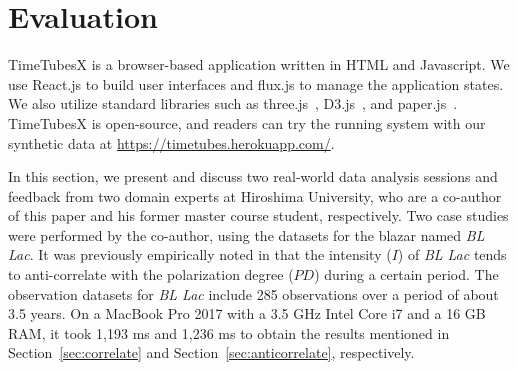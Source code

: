 \section{Evaluation\label{sec:evaluation}}
TimeTubesX is a browser-based application written in HTML and Javascript.
We use React.js to build user interfaces and flux.js to manage the application states.
We also utilize standard libraries such as three.js~\cite{three_framework}, D3.js~\cite{d3_framework}, and paper.js~\cite{paper_framework}.
TimeTubesX is open-source, and 
readers can try the running system with our synthetic data at \url{https://timetubes.herokuapp.com/}.

In this section, we present and discuss two real-world data analysis sessions and feedback from two domain experts at Hiroshima University, who are a co-author of this paper and his former master course student, respectively.
Two case studies were performed by the co-author, using the datasets for the blazar named \emph{BL Lac}.
It was previously empirically noted in\cite{Gaur2014} that the intensity ($I$) of \emph{BL Lac} tends to anti-correlate with the polarization degree ($PD$) during a certain period.
The observation datasets for \emph{BL Lac} include 285 observations over a period of about 3.5 years.
On a MacBook Pro 2017 with a 3.5 GHz Intel Core i7 and a 16 GB RAM, it took 1{,}193 ms and 1{,}236 ms to obtain the results mentioned in Section~\ref{sec:correlate} and Section~\ref{sec:anticorrelate}, respectively.
%


